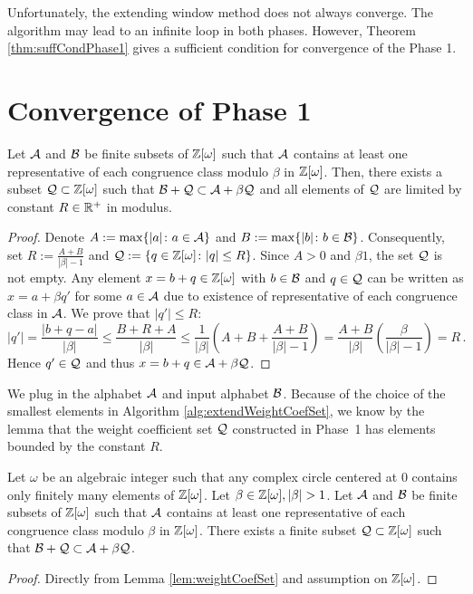 Unfortunately, the extending window method does not always converge. The algorithm may lead to an infinite loop in both phases. 
However, Theorem \ref{thm:suffCondPhase1} gives a sufficient condition for convergence of the Phase 1. 

\section{Convergence of Phase 1}
\label{sec:convergencePhase1}
\begin{lem}
\label{lem:weightCoefSet}
    Let $\mathcal{A}$ and $\mathcal{B}$ be finite subsets of $\mathbb{Z}[\omega]$ such that $\mathcal{A}$ contains at least one representative of each congruence class modulo $\beta$ in $\mathbb{Z}[\omega]$. Then, there exists a subset $\mathcal{Q}\subset\mathbb{Z}[\omega]$ such that $ \mathcal{B} + \mathcal{Q} \subset \mathcal{A} + \beta \mathcal{Q}$ and all elements of $\mathcal{Q}$ are limited by constant $R\in \mathbb{R}^+$ in modulus.
\end{lem}
\begin{proof}
 Denote $A:=\max\{|a|\colon a \in \mathcal{A}\}$ and $B:=\max\{|b|\colon b\in\mathcal{B}\}$. Consequently, set $R:=\frac{A+B}{|\beta|-1}$ and $\mathcal{Q}:=\{q\in\mathbb{Z}[\omega]\colon |q|\leq R\}$. Since $A>0$ and $\beta1$, the set $\mathcal{Q}$ is not empty. Any element $x=b+q \in \mathbb{Z}[\omega]$ with $b\in\mathcal{B}$ and $q\in\mathcal{Q}$ can be written as $x=a+\beta q'$ for some $a\in\mathcal{A}$ due to existence of representative of each congruence class in $\mathcal{A}$. We prove that $|q'|\leq R$:
 $$
    |q'|=\frac{|b+q-a|}{|\beta|}\leq \frac{B+R+A}{|\beta|} \leq \frac{1}{|\beta|}\left(A+B+\frac{A+B}{|\beta|-1}\right)  =\frac{A+B}{|\beta|}\left(\frac{\beta}{|\beta|-1}\right)=R\,.
 $$ 
 Hence $q'\in\mathcal{Q}$ and thus  $x=b+q \in \mathcal{A} + \beta \mathcal{Q}$.
\end{proof}
We plug in the alphabet $\mathcal{A}$ and input alphabet $\mathcal{B}$. Because of the choice of the smallest elements in Algorithm \ref{alg:extendWeightCoefSet}, we know by the lemma that the weight coefficient set $\mathcal{Q}$ constructed in Phase~1 has elements bounded by the constant $R$. 
\begin{theo}
\label{thm:suffCondPhase1}
    Let $\omega$ be an algebraic integer such that any complex circle centered at 0 contains only finitely  many elements of $\mathbb{Z}[\omega]$. Let $\beta \in \Zomega, |\beta|>1$. Let $\mathcal{A}$ and $\mathcal{B}$ be finite subsets of $\mathbb{Z}[\omega]$ such that $\mathcal{A}$ contains at least one representative of each congruence class modulo $\beta$ in $\mathbb{Z}[\omega]$. There exists a finite subset $\mathcal{Q}\subset\mathbb{Z}[\omega]$ such that $ \mathcal{B} + \mathcal{Q} \subset \mathcal{A} + \beta \mathcal{Q}$.
\end{theo} 
\begin{proof}
    Directly from Lemma \ref{lem:weightCoefSet} and assumption on $\mathbb{Z}[\omega]$.
\end{proof}
